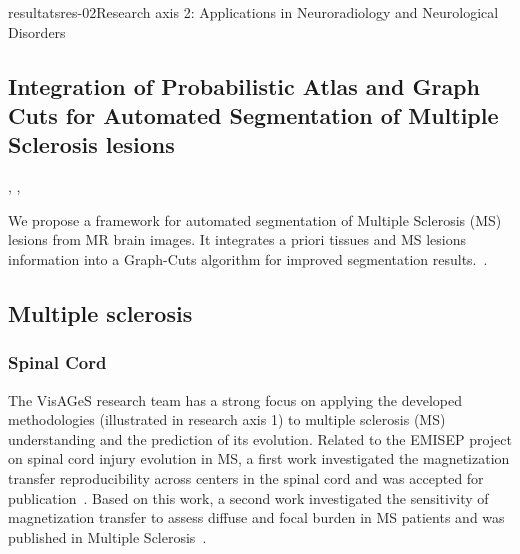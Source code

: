 \documentclass{ra2018}
\begin{document}
\begin{module}{resultats}{res-02}{Research axis 2: Applications in Neuroradiology and Neurological Disorders}
\subsection{Integration of Probabilistic Atlas and Graph Cuts for Automated Segmentation of Multiple Sclerosis lesions}
\begin{participants}
      ,
      ,
\end{participants}
We propose a framework for automated segmentation of Multiple Sclerosis (MS) lesions
from MR brain images. It integrates a priori tissues and MS lesions information into a Graph-Cuts algorithm for improved segmentation results.~\cite{galassi:hal-01823801}.

\subsection{Multiple sclerosis}

\subsubsection{Spinal Cord}
\begin{participants}
\end{participants}
The VisAGeS research team has a strong focus on applying the developed methodologies (illustrated in research axis 1) to multiple sclerosis (MS) understanding and the prediction of its evolution. Related to the EMISEP project on spinal cord injury evolution in MS, a first work investigated the magnetization transfer reproducibility across centers in the spinal cord and was accepted for publication~\cite{combes:hal-01934605}. Based on this work, a second work investigated the sensitivity of magnetization transfer to assess diffuse and focal burden in MS patients and was published in Multiple Sclerosis~\cite{combes:hal-01934621}.


\end{module}
\end{document}
